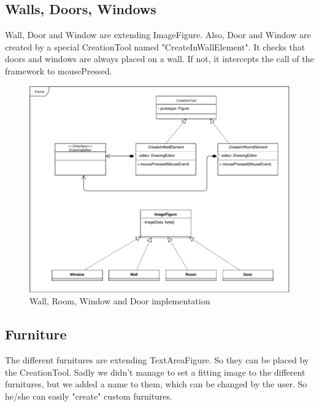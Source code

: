 \subsection{Walls, Doors, Windows}

Wall, Door and Window are extending ImageFigure.
Also, Door and Window are created by a special CreationTool named "CreateInWallElement".
It checks that doors and windows are always placed on a wall.
If not, it intercepts the call of the framework to mousePressed.

\begin{figure}[h]
    \includegraphics[keepaspectratio,width=\textwidth]{images/uml.pdf}
    \caption{Wall, Room, Window and Door implementation}
\end{figure}

\subsection{Furniture}

The different furnitures are extending TextAreaFigure. So they can be placed by the CreationTool. Sadly we didn't manage to set a fitting image to the different furnitures, but we added a name to them, which can be changed by the user. So he/she can easily "create" custom furnitures.

